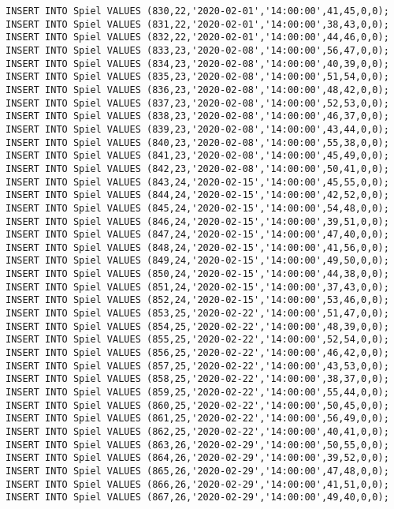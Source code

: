 \documentclass{lehramt-informatik-aufgabe}
\begin{document}
\begin{verbatim}
INSERT INTO Spiel VALUES (830,22,'2020-02-01','14:00:00',41,45,0,0);
INSERT INTO Spiel VALUES (831,22,'2020-02-01','14:00:00',38,43,0,0);
INSERT INTO Spiel VALUES (832,22,'2020-02-01','14:00:00',44,46,0,0);
INSERT INTO Spiel VALUES (833,23,'2020-02-08','14:00:00',56,47,0,0);
INSERT INTO Spiel VALUES (834,23,'2020-02-08','14:00:00',40,39,0,0);
INSERT INTO Spiel VALUES (835,23,'2020-02-08','14:00:00',51,54,0,0);
INSERT INTO Spiel VALUES (836,23,'2020-02-08','14:00:00',48,42,0,0);
INSERT INTO Spiel VALUES (837,23,'2020-02-08','14:00:00',52,53,0,0);
INSERT INTO Spiel VALUES (838,23,'2020-02-08','14:00:00',46,37,0,0);
INSERT INTO Spiel VALUES (839,23,'2020-02-08','14:00:00',43,44,0,0);
INSERT INTO Spiel VALUES (840,23,'2020-02-08','14:00:00',55,38,0,0);
INSERT INTO Spiel VALUES (841,23,'2020-02-08','14:00:00',45,49,0,0);
INSERT INTO Spiel VALUES (842,23,'2020-02-08','14:00:00',50,41,0,0);
INSERT INTO Spiel VALUES (843,24,'2020-02-15','14:00:00',45,55,0,0);
INSERT INTO Spiel VALUES (844,24,'2020-02-15','14:00:00',42,52,0,0);
INSERT INTO Spiel VALUES (845,24,'2020-02-15','14:00:00',54,48,0,0);
INSERT INTO Spiel VALUES (846,24,'2020-02-15','14:00:00',39,51,0,0);
INSERT INTO Spiel VALUES (847,24,'2020-02-15','14:00:00',47,40,0,0);
INSERT INTO Spiel VALUES (848,24,'2020-02-15','14:00:00',41,56,0,0);
INSERT INTO Spiel VALUES (849,24,'2020-02-15','14:00:00',49,50,0,0);
INSERT INTO Spiel VALUES (850,24,'2020-02-15','14:00:00',44,38,0,0);
INSERT INTO Spiel VALUES (851,24,'2020-02-15','14:00:00',37,43,0,0);
INSERT INTO Spiel VALUES (852,24,'2020-02-15','14:00:00',53,46,0,0);
INSERT INTO Spiel VALUES (853,25,'2020-02-22','14:00:00',51,47,0,0);
INSERT INTO Spiel VALUES (854,25,'2020-02-22','14:00:00',48,39,0,0);
INSERT INTO Spiel VALUES (855,25,'2020-02-22','14:00:00',52,54,0,0);
INSERT INTO Spiel VALUES (856,25,'2020-02-22','14:00:00',46,42,0,0);
INSERT INTO Spiel VALUES (857,25,'2020-02-22','14:00:00',43,53,0,0);
INSERT INTO Spiel VALUES (858,25,'2020-02-22','14:00:00',38,37,0,0);
INSERT INTO Spiel VALUES (859,25,'2020-02-22','14:00:00',55,44,0,0);
INSERT INTO Spiel VALUES (860,25,'2020-02-22','14:00:00',50,45,0,0);
INSERT INTO Spiel VALUES (861,25,'2020-02-22','14:00:00',56,49,0,0);
INSERT INTO Spiel VALUES (862,25,'2020-02-22','14:00:00',40,41,0,0);
INSERT INTO Spiel VALUES (863,26,'2020-02-29','14:00:00',50,55,0,0);
INSERT INTO Spiel VALUES (864,26,'2020-02-29','14:00:00',39,52,0,0);
INSERT INTO Spiel VALUES (865,26,'2020-02-29','14:00:00',47,48,0,0);
INSERT INTO Spiel VALUES (866,26,'2020-02-29','14:00:00',41,51,0,0);
INSERT INTO Spiel VALUES (867,26,'2020-02-29','14:00:00',49,40,0,0);

\end{verbatim}
\end{document}
